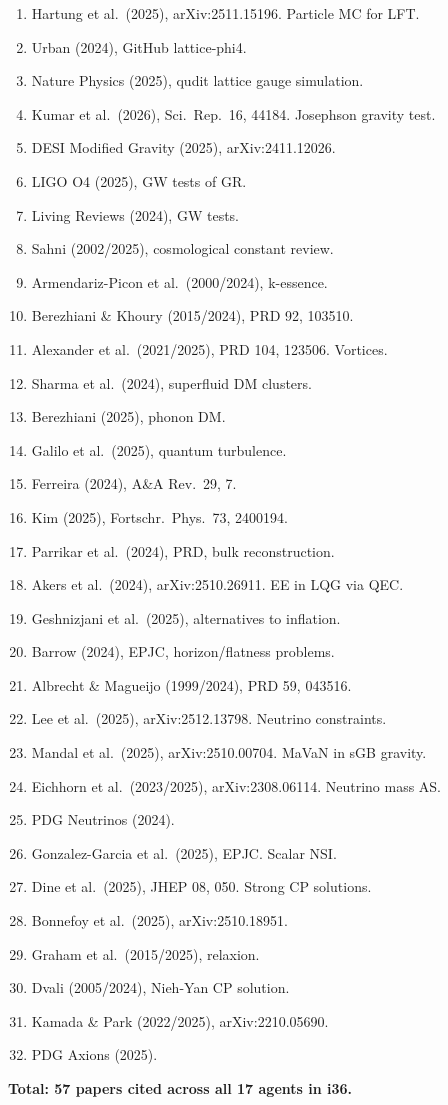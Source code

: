 \documentclass[11pt,a4paper]{article}
\begin{document}
\begin{enumerate}
\item Hartung et al.\ (2025), arXiv:2511.15196. Particle MC for LFT.
\item Urban (2024), GitHub lattice-phi4.
\item Nature Physics (2025), qudit lattice gauge simulation.
\item Kumar et al.\ (2026), Sci.\ Rep.\ 16, 44184. Josephson gravity test.
\item DESI Modified Gravity (2025), arXiv:2411.12026.
\item LIGO O4 (2025), GW tests of GR.
\item Living Reviews (2024), GW tests.
\item Sahni (2002/2025), cosmological constant review.
\item Armendariz-Picon et al.\ (2000/2024), k-essence.
\item Berezhiani \& Khoury (2015/2024), PRD 92, 103510.
\item Alexander et al.\ (2021/2025), PRD 104, 123506. Vortices.
\item Sharma et al.\ (2024), superfluid DM clusters.
\item Berezhiani (2025), phonon DM.
\item Galilo et al.\ (2025), quantum turbulence.
\item Ferreira (2024), A\&A Rev.\ 29, 7.
\item Kim (2025), Fortschr.\ Phys.\ 73, 2400194.
\item Parrikar et al.\ (2024), PRD, bulk reconstruction.
\item Akers et al.\ (2024), arXiv:2510.26911. EE in LQG via QEC.
\item Geshnizjani et al.\ (2025), alternatives to inflation.
\item Barrow (2024), EPJC, horizon/flatness problems.
\item Albrecht \& Magueijo (1999/2024), PRD 59, 043516.
\item Lee et al.\ (2025), arXiv:2512.13798. Neutrino constraints.
\item Mandal et al.\ (2025), arXiv:2510.00704. MaVaN in sGB gravity.
\item Eichhorn et al.\ (2023/2025), arXiv:2308.06114. Neutrino mass AS.
\item PDG Neutrinos (2024).
\item Gonzalez-Garcia et al.\ (2025), EPJC. Scalar NSI.
\item Dine et al.\ (2025), JHEP 08, 050. Strong CP solutions.
\item Bonnefoy et al.\ (2025), arXiv:2510.18951.
\item Graham et al.\ (2015/2025), relaxion.
\item Dvali (2005/2024), Nieh-Yan CP solution.
\item Kamada \& Park (2022/2025), arXiv:2210.05690.
\item PDG Axions (2025).
\end{enumerate}

\textbf{Total: 57 papers cited across all 17 agents in i36.}
\end{document}
